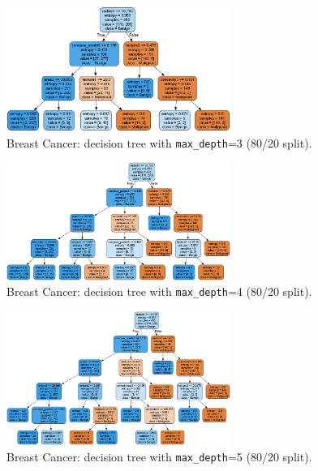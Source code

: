 \begin{figure}[H]
	\centering
	\includegraphics[width=0.65\textwidth]{imgs/dt-mini/dt__breast_cancer__80_vs_20__3.png}
	\caption{Breast Cancer: decision tree with \texttt{max\_depth}=3 (80/20 split).}\label{fig:bc-dt-depth-3}
\end{figure}

\begin{figure}[H]
	\centering
	\includegraphics[width=0.65\textwidth]{imgs/dt-mini/dt__breast_cancer__80_vs_20__4.png}
	\caption{Breast Cancer: decision tree with \texttt{max\_depth}=4 (80/20 split).}\label{fig:bc-dt-depth-4}
\end{figure}

\begin{figure}[H]
	\centering
	\includegraphics[width=0.65\textwidth]{imgs/dt-mini/dt__breast_cancer__80_vs_20__5.png}
	\caption{Breast Cancer: decision tree with \texttt{max\_depth}=5 (80/20 split).}\label{fig:bc-dt-depth-5}
\end{figure}

